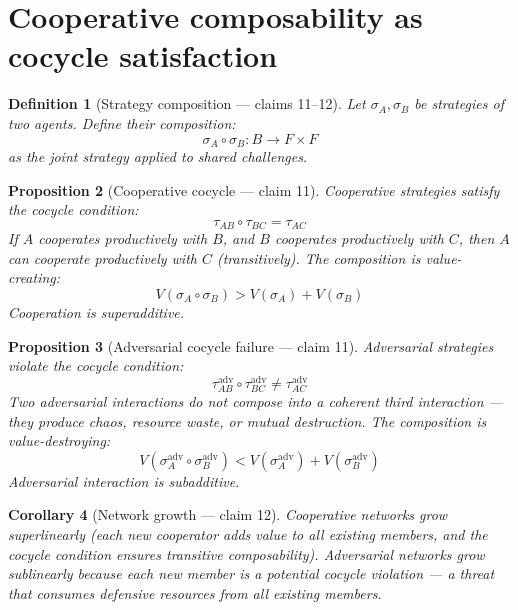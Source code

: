\documentclass[11pt,a4paper]{article}
\newtheorem{definition}{Definition}[section]
\newtheorem{proposition}[definition]{Proposition}
\newtheorem{corollary}[definition]{Corollary}
\begin{document}
\section{Cooperative composability as cocycle satisfaction}
\label{sec:composability}

\begin{definition}[Strategy composition --- claims 11--12]
\label{def:composition}
Let $\sigma_A, \sigma_B$ be strategies of two agents. Define their
composition:
\[
  \sigma_A \circ \sigma_B : B \to F \times F
\]
as the joint strategy applied to shared challenges.
\end{definition}

\begin{proposition}[Cooperative cocycle --- claim 11]
\label{prop:coop-cocycle}
Cooperative strategies satisfy the cocycle condition:
\[
  \tau_{AB} \circ \tau_{BC} = \tau_{AC}
\]
If $A$ cooperates productively with $B$, and $B$ cooperates productively
with $C$, then $A$ can cooperate productively with $C$ (transitively).
The composition is value-creating:
\[
  V(\sigma_A \circ \sigma_B) > V(\sigma_A) + V(\sigma_B)
\]
Cooperation is superadditive.
\end{proposition}

\begin{proposition}[Adversarial cocycle failure --- claim 11]
\label{prop:adv-failure}
Adversarial strategies violate the cocycle condition:
\[
  \tau_{AB}^{\text{adv}} \circ \tau_{BC}^{\text{adv}} \neq \tau_{AC}^{\text{adv}}
\]
Two adversarial interactions do not compose into a coherent third
interaction --- they produce chaos, resource waste, or mutual
destruction. The composition is value-destroying:
\[
  V(\sigma_A^{\text{adv}} \circ \sigma_B^{\text{adv}})
  < V(\sigma_A^{\text{adv}}) + V(\sigma_B^{\text{adv}})
\]
Adversarial interaction is subadditive.
\end{proposition}

\begin{corollary}[Network growth --- claim 12]
Cooperative networks grow superlinearly (each new cooperator adds value
to all existing members, and the cocycle condition ensures transitive
composability). Adversarial networks grow sublinearly because each new
member is a potential cocycle violation --- a threat that consumes
defensive resources from all existing members.
\end{corollary}
\end{document}
